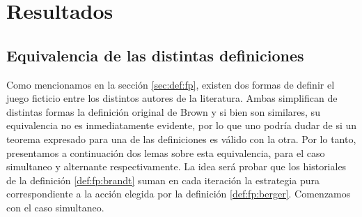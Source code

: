 \chapter{Resultados}  \label{cap:aportes}

\section{Equivalencia de las distintas definiciones}

Como mencionamos en la sección \ref{sec:def:fp}, existen dos formas de definir el juego ficticio entre los distintos autores de la literatura. Ambas simplifican de distintas formas la definición original de Brown y si bien son similares, su equivalencia no es inmediatamente evidente, por lo que uno podría dudar de si un teorema expresado para una de las definiciones es válido con la otra. Por lo tanto, presentamos a continuación dos lemas sobre esta equivalencia, para el caso simultaneo y alternante respectivamente. La idea será probar que los historiales de la definición \ref{def:fp:brandt} suman en cada iteración la estrategia pura correspondiente a la acción elegida por la definición \ref{def:fp:berger}. Comenzamos con el caso simultaneo.

